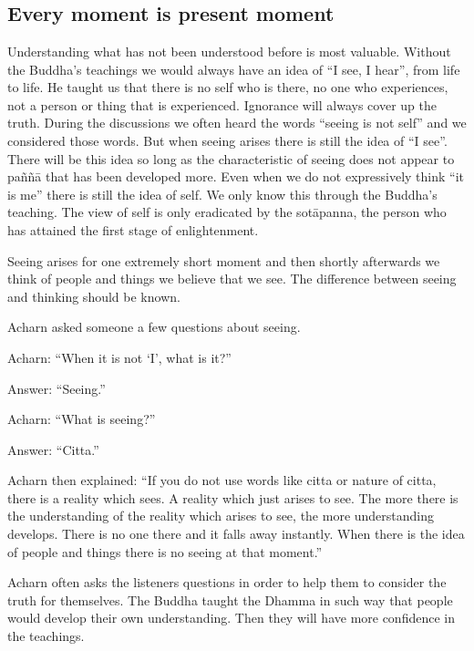 \chapter[Every moment is present moment]{}
\section*{Every moment is present moment}

Understanding what has not been understood before is most valuable.
Without the Buddha's teachings we would always have an idea of ``I see,
I hear'', from life to life. He taught us that there is no self who is
there, no one who experiences, not a person or thing that is
experienced. Ignorance will always cover up the truth. During the
discussions we often heard the words ``seeing is not self'' and we
considered those words. But when seeing arises there is still the idea
of ``I see''. There will be this idea so long as the characteristic of
seeing does not appear to paññā that has been developed more. Even when
we do not expressively think ``it is me'' there is still the idea of
self. We only know this through the Buddha's teaching. The view of self
is only eradicated by the sotāpanna, the person who has attained the
first stage of enlightenment.

Seeing arises for one extremely short moment and then shortly afterwards
we think of people and things we believe that we see. The difference
between seeing and thinking should be known.

Acharn asked someone a few questions about seeing.

Acharn: ``When it is not `I', what is it?''

Answer: ``Seeing.''

Acharn: ``What is seeing?''

Answer: ``Citta.''

Acharn then explained: ``If you do not use words like citta or nature of
citta, there is a reality which sees. A reality which just arises to
see. The more there is the understanding of the reality which arises to
see, the more understanding develops. There is no one there and it falls
away instantly. When there is the idea of people and things there is no
seeing at that moment.''

Acharn often asks the listeners questions in order to help them to
consider the truth for themselves. The Buddha taught the Dhamma in such
way that people would develop their own understanding. Then they will
have more confidence in the teachings.

